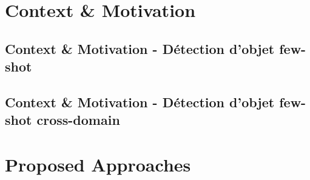 \documentclass[xcolor=table, 8pt]{beamer}
\begin{document}
    \maketitle
    


    \section{Context \& Motivation}\label{sec:od-fsod}

    \subsection{Context \& Motivation - Détection d'objet few-shot}\label{subsec:few-shot-object-detection}
    
    

    \subsection{Context \& Motivation - Détection d'objet few-shot cross-domain}\label{subsec:cd-fsod}
    

    
    
    

    \section{Proposed Approaches}

%     
\end{document}
